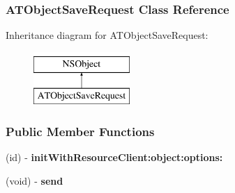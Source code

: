 \hypertarget{interface_a_t_object_save_request}{
\subsubsection{ATObjectSaveRequest Class Reference}
\label{interface_a_t_object_save_request}
}
Inheritance diagram for ATObjectSaveRequest:\begin{figure}[h]
\begin{center}
\leavevmode
\includegraphics[height=2.000000cm]{interface_a_t_object_save_request}
\end{center}
\end{figure}
\subsubsection*{Public Member Functions}
\begin{DoxyCompactItemize}
\item 
\hypertarget{interface_a_t_object_save_request_a4251843e836ae9afa7b5ffb5e30bdb0f}{
(id) -\/ {\bfseries initWithResourceClient:object:options:}}
\label{interface_a_t_object_save_request_a4251843e836ae9afa7b5ffb5e30bdb0f}

\item 
\hypertarget{interface_a_t_object_save_request_a8bd540fab41eb1cbff19cba6519bf0f6}{
(void) -\/ {\bfseries send}}
\label{interface_a_t_object_save_request_a8bd540fab41eb1cbff19cba6519bf0f6}

\end{DoxyCompactItemize}
